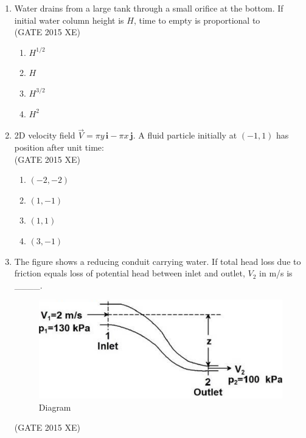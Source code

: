 \documentclass[journal,12pt,onecolumn]{IEEEtran}
\begin{document}
\begin{enumerate}
\begin{multicols}{4}
\begin{enumerate}
\item $-1.0$
\item $0.5$
\item $1.5$
\item $2.0$
\end{enumerate}
\end{multicols}

\item Water drains from a large tank through a small orifice at the bottom. If initial water column height is $H$, time to empty is proportional to  \\
\hfill{(GATE 2015 XE)}

\begin{multicols}{4}
\begin{enumerate}
\item $H^{1/2}$
\item $H$
\item $H^{3/2}$
\item $H^2$
\end{enumerate}
\end{multicols}

\item 2D velocity field $\vec{V} = \pi y \,\mathbf{i} - \pi x\,\mathbf{j}$. A fluid particle initially at $(-1,1)$ has position after unit time:\\

\hfill{(GATE 2015 XE)} 
\begin{multicols}{4}
\begin{enumerate}
\item $(-2,-2)$
\item $(1,-1)$
\item $(1,1)$
\item $(3,-1)$
\end{enumerate}
\end{multicols}

\newpage

\item The figure shows a reducing conduit carrying water. If total head loss due to friction equals loss of potential head between inlet and outlet, $V_2$ in m/s is \_\_\_\_. \\

\begin{figure}[htbp]
  \centering
  \includegraphics[width=.68\columnwidth]{figs/B/fig4.png} 
  \caption{Diagram}
  \label{fig:figs/B/fig4.png}
\end{figure}
\hfill{(GATE 2015 XE)} \\


\end{enumerate}
\end{document}
